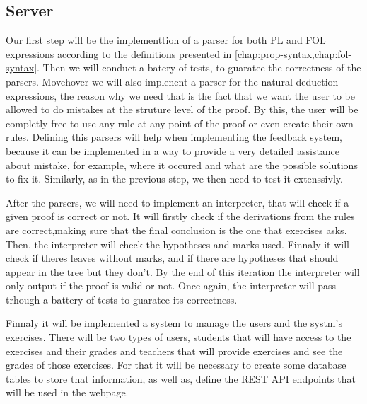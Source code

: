 \subsection{Server}
Our first step will be the implementtion of a parser for both PL and FOL expressions according to the definitions presented in \ref{chap:prop-syntax,chap:fol-syntax}. Then we will conduct a batery of tests, to guaratee the correctness of the parsers. Movehover we will also implenent a parser for the natural deduction expressions, the reason why we need that is the fact that we want  the user to be allowed to do mistakes at the struture level of the proof. By this, the user will be completly free to use any rule at any point of the proof or even create their own rules. Defining this parsers will help when implementing the feedback system, because it can be implemented in a way to provide a very detailed assistance about mistake, for example, where it occured and what are the possible solutions to fix it. Similarly, as in the previous step, we then need to test it extenssivly. 

After the parsers, we will need to implement an interpreter, that will check if a given proof is correct or not. It will firstly check if the derivations from the rules are correct,making sure that the final conclusion is the one that exercises asks. Then, the interpreter will check the hypotheses and marks used. Finnaly it will check if theres leaves without marks, and if there are hypotheses that should appear in the tree but they don't. By the end of this iteration the interpreter will only output if the proof is valid or not. Once again, the interpreter will pass trhough a battery of tests to guaratee its correctness.

Finnaly it will be implemented a system to manage the users and the systm's exercises. There will be two types of users, students that will have access to the exercises and their grades and teachers that will provide exercises and see the grades of those exercises. For that it will be necessary to create some database tables to store that information, as well as, define the REST API endpoints that will be used in the webpage.

